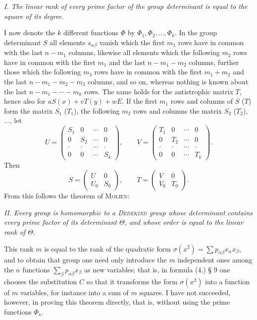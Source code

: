 \documentclass[11pt]{article}
\begin{document}
\emph{I. The linear rank of every prime factor of the group determinant is equal to the square of its degree.}

I now denote the $k$ different functions $\Phi$ by $\Phi_1,\Phi_2,\ldots,\Phi_k$. In the group determinant $S$ all elements $s_{\alpha\beta}$ vanish which the first $m_1$ rows have in common with the last $n-m_1$ columns, likewise all elements which the following $m_2$ rows have in common with the first $m_1$ and the last $n-m_1-m_2$ columns, further those which the following $m_3$ rows have in common with the first $m_1+m_2$ and the last $n-m_1-m_2-m_3$ columns, and so on, whereas nothing is known about the last $n-m_1-\cdots-m_k$ rows. The same holds for the antistrophic matrix $T$, hence also for $uS(x)+vT(y)+wE$. If the first $m_1$ rows and columns of $S$ ($T$) form the matrix $S_1$ ($T_1$), the following $m_2$ rows and columns the matrix $S_2$ ($T_2$), $\ldots$, let
\[
 U=\begin{pmatrix}
 S_1&0&\cdots&0\\
 0&S_2&\cdots&0\\
 \cdot&\cdot&\cdots&\cdot\\
 0&0&\cdots&S_k
 \end{pmatrix},
 \qquad
 V=\begin{pmatrix}
 T_1&0&\cdots&0\\
 0&T_2&\cdots&0\\
 \cdot&\cdot&\cdots&\cdot\\
 0&0&\cdots&T_k
 \end{pmatrix}.
\]
Then
\[
 S=\begin{pmatrix}U&0\\ U_0&S_0\end{pmatrix},
 \qquad
 T=\begin{pmatrix}V&0\\ V_0&T_0\end{pmatrix}.
\]
From this follows the theorem of \textsc{Molien}:

\emph{II. Every group is homomorphic to a \textsc{Dedekind} group whose determinant contains every prime factor of its determinant $\Theta$, and whose order is equal to the linear rank of $\Theta$.}

This rank $m$ is equal to the rank of the quadratic form $\sigma(x^2)=\sum p_{\alpha\beta}x_\alpha x_\beta$, and to obtain that group one need only introduce the $m$ independent ones among the $n$ functions $\sum_\beta p_{\alpha\beta}x_\beta$ as new variables; that is, in formula (4.) § 9 one chooses the substitution $C$ so that it transforms the form $\sigma(x^2)$ into a function of $m$ variables, for instance into a sum of $m$ squares. I have not succeeded, however, in proving this theorem directly, that is, without using the prime functions $\Phi_\kappa$.
\end{document}

